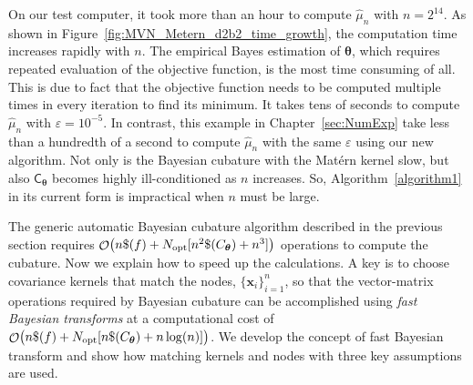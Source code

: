 \documentclass{iitthesis}          %
\DeclareMathOperator{\Order}{{\mathcal O}}
\newcommand{\bm}[1]{\boldsymbol{#1}}
\newcommand{\vtheta}{{\bm{\theta}}}
\newcommand{\vx}{\bm{x}}
\newcommand{\mC}{\mathsf{C}}
\newcommand{\hmu}{\widehat{\mu}}
\newcommand{\opt}{\textup{opt}}
\newcommand\figref{Figure~\ref}
\begin{document}
On our test computer, it took more than an hour to compute $\hmu_n$ with $n=2^{14}$. 
As shown in \figref{fig:MVN_Metern_d2b2_time_growth}, the computation time increases rapidly with $n$. 
The empirical Bayes estimation of $\vtheta$, which requires repeated evaluation of the objective function, is the most time consuming of all. This is due to fact that the objective function needs to be computed multiple times in every iteration to find its minimum. It takes tens of seconds to compute $\hmu_n$ with $\varepsilon = 10^{-5}$.   In contrast, this example in Chapter~\ref{sec:NumExp} take less than a hundredth of a second to compute $\hmu_n$ with the same $\varepsilon$ using our new algorithm. Not only is the Bayesian cubature with the Mat\'ern kernel slow, but also $\mC_\vtheta$ becomes highly ill-conditioned as $n$ increases.
So, Algorithm~\ref{algorithm1} in its current form is impractical when $n$ must be large.









\label{sec:fast_BC}



The generic automatic Bayesian cubature algorithm described in the previous section requires $\Order\bigl(n \$(f) +  N_{\opt} [n^2 \$(C_\vtheta) + n^3]\bigr)$ operations to compute the cubature. Now we explain how to speed up the calculations. A key is to choose covariance kernels that match the nodes, $\{\vx_i\}_{i=1}^n$, so that the vector-matrix operations required by Bayesian cubature can be accomplished using \emph{fast Bayesian transforms} at a computational cost of $\Order\bigl(n \$(f) + N_{\opt} [n \$(C_\vtheta)  + n \log(n)] \bigr)$.
We develop the concept of fast Bayesian transform and show how matching kernels and nodes with three key assumptions are used. %
\end{document}
